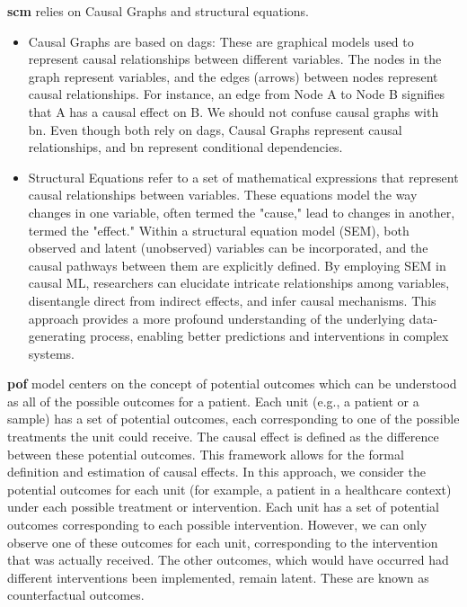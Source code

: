 \textbf{\ac{scm}} relies on Causal Graphs and structural equations.

\begin{itemize}
    \item Causal Graphs are based on \acp{dag}: These are graphical models used to represent causal relationships between different variables. The nodes in the graph represent variables, and the edges (arrows) between nodes represent causal relationships. For instance, an edge from Node A to Node B signifies that A has a causal effect on B. We should not confuse causal graphs with \ac{bn}. Even though both rely on \acp{dag}, Causal Graphs represent causal relationships, and \ac{bn} represent conditional dependencies.
\item Structural Equations refer to a set of mathematical expressions that represent causal relationships between variables. These equations model the way changes in one variable, often termed the "cause," lead to changes in another, termed the "effect." Within a structural equation model (SEM), both observed and latent (unobserved) variables can be incorporated, and the causal pathways between them are explicitly defined. By employing SEM in causal ML, researchers can elucidate intricate relationships among variables, disentangle direct from indirect effects, and infer causal mechanisms. This approach provides a more profound understanding of the underlying data-generating process, enabling better predictions and interventions in complex systems.

\end{itemize}

\textbf{\Ac{pof}} model centers on the concept of potential outcomes which can be understood as all of the possible outcomes for a patient.  Each unit (e.g., a patient or a sample) has a set of potential outcomes, each corresponding to one of the possible treatments the unit could receive. The causal effect is defined as the difference between these potential outcomes. This framework allows for the formal definition and estimation of causal effects. In this approach, we consider the potential outcomes for each unit (for example, a patient in a healthcare context) under each possible treatment or intervention. Each unit has a set of potential outcomes corresponding to each possible intervention. However, we can only observe one of these outcomes for each unit, corresponding to the intervention that was actually received. The other outcomes, which would have occurred had different interventions been implemented, remain latent. These are known as counterfactual outcomes.

